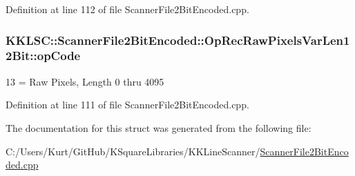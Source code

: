 Definition at line 112 of file Scanner\+File2\+Bit\+Encoded.\+cpp.

\subsubsection[{\texorpdfstring{op\+Code}{opCode}}]{ K\+K\+L\+S\+C\+::\+Scanner\+File2\+Bit\+Encoded\+::\+Op\+Rec\+Raw\+Pixels\+Var\+Len12\+Bit\+::op\+Code}\hypertarget{struct_scanner_file2_bit_encoded_1_1_op_rec_raw_pixels_var_len12_bit_ab2adc924cdf5a5db82edb8bdce14a350}{}\label{struct_scanner_file2_bit_encoded_1_1_op_rec_raw_pixels_var_len12_bit_ab2adc924cdf5a5db82edb8bdce14a350}
13 = Raw Pixels, Length 0 thru 4095 

Definition at line 111 of file Scanner\+File2\+Bit\+Encoded.\+cpp.



The documentation for this struct was generated from the following file\+:\begin{DoxyCompactItemize}
\item 
C\+:/\+Users/\+Kurt/\+Git\+Hub/\+K\+Square\+Libraries/\+K\+K\+Line\+Scanner/\hyperlink{_scanner_file2_bit_encoded_8cpp}{Scanner\+File2\+Bit\+Encoded.\+cpp}\end{DoxyCompactItemize}
